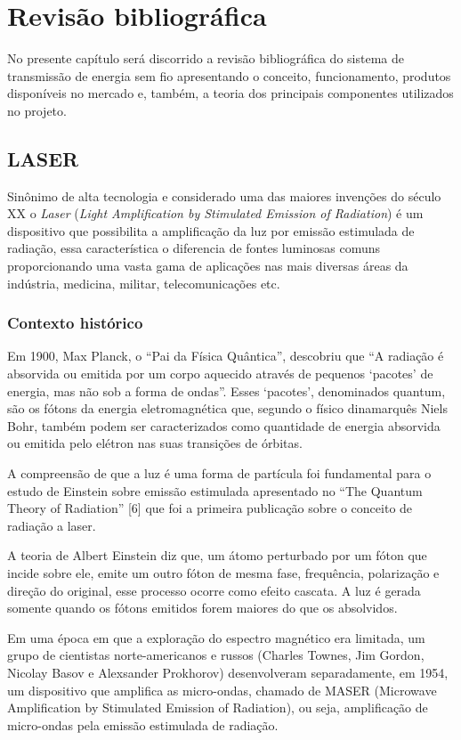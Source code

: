 \chapter{Revisão bibliográfica}

No presente capítulo será discorrido a revisão bibliográfica do sistema de transmissão de energia sem fio apresentando o conceito, funcionamento, produtos disponíveis no mercado e, também, a teoria dos principais componentes utilizados no projeto.

\section{LASER}

Sinônimo de alta tecnologia e considerado uma das maiores invenções do século XX o \emph{Laser} (\emph{Light Amplification by Stimulated Emission of Radiation}) é um dispositivo que possibilita a amplificação da luz por emissão estimulada de radiação, essa característica o diferencia de fontes luminosas comuns proporcionando uma vasta gama de aplicações nas mais diversas áreas da indústria, medicina, militar, telecomunicações etc.

\subsection{Contexto histórico}

Em 1900, Max Planck, o ``Pai da Física Quântica'', descobriu que ``A radiação é absorvida ou emitida por um corpo aquecido através de pequenos `pacotes' de energia, mas não sob a forma de ondas''. Esses `pacotes', denominados quantum, são os fótons da energia eletromagnética que, segundo o físico dinamarquês Niels Bohr, também podem ser caracterizados como quantidade de energia absorvida ou emitida pelo elétron nas suas transições de órbitas.

A compreensão de que a luz é uma forma de partícula foi fundamental para o estudo de Einstein sobre emissão estimulada apresentado no ``The Quantum Theory of Radiation'' [6] que foi a primeira publicação sobre o conceito de radiação a laser.

A teoria de Albert Einstein diz que, um átomo perturbado por um fóton que incide sobre ele, emite um outro fóton de mesma fase, frequência, polarização e direção do original, esse processo ocorre como efeito cascata. A luz é gerada somente quando os fótons emitidos forem maiores do que os absolvidos.

Em uma época em que a exploração do espectro magnético era limitada, um grupo de cientistas norte-americanos e russos (Charles Townes, Jim Gordon, Nicolay Basov e Alexsander Prokhorov) desenvolveram separadamente, em 1954, um dispositivo que amplifica as micro-ondas, chamado de MASER (Microwave Amplification by Stimulated Emission of Radiation), ou seja, amplificação de micro-ondas pela emissão estimulada de radiação.

